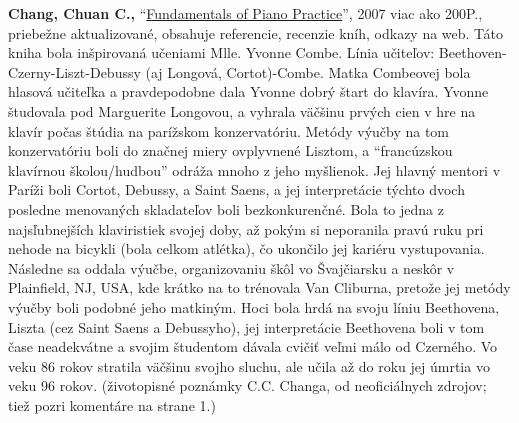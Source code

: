\textbf{Chang, Chuan C.,} “\href{http://www.pianopractice.org/}{Fundamentals of Piano Practice}”, 2007 viac ako 200P., priebežne aktualizované, obsahuje referencie, recenzie kníh, odkazy na web. Táto kniha bola inšpirovaná učeniami Mlle. Yvonne Combe. Línia učiteľov: Beethoven-Czerny-Liszt-Debussy (aj Longová, Cortot)-Combe. Matka Combeovej bola hlasová učiteľka a pravdepodobne dala Yvonne dobrý štart do klavíra. Yvonne študovala pod Marguerite Longovou, a vyhrala väčšinu prvých cien v hre na klavír počas štúdia na parížskom konzervatóriu. Metódy výučby na tom konzervatóriu boli do značnej miery ovplyvnené Lisztom, a “francúzskou klavírnou školou/hudbou” odráža mnoho z jeho myšlienok. Jej hlavný mentori v Paríži boli Cortot, Debussy, a Saint Saens, a jej interpretácie týchto dvoch posledne menovaných skladateľov boli bezkonkurenčné. Bola to jedna z najsľubnejších klaviristiek svojej doby, až pokým si neporanila pravú ruku pri nehode na bicykli (bola celkom atlétka), čo ukončilo jej kariéru vystupovania. Následne sa oddala výučbe, organizovaniu škôl vo Švajčiarsku a neskôr v Plainfield, NJ, USA, kde krátko na to trénovala Van Cliburna, pretože jej metódy výučby boli podobné jeho matkiným. Hoci bola hrdá na svoju líniu Beethovena, Liszta (cez Saint Saens a Debussyho), jej interpretácie Beethovena boli v tom čase neadekvátne a svojim študentom dávala cvičiť veľmi málo od Czerného. Vo veku 86 rokov stratila väčšinu svojho sluchu, ale učila až do roku jej úmrtia vo veku 96 rokov. (životopisné poznámky C.C. Changa, od neoficiálnych zdrojov; tiež pozri komentáre na strane 1.)

